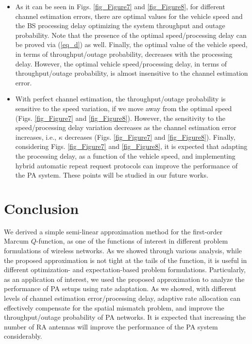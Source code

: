 \begin{itemize}
\begin{figure}
\end{figure}

    
    \item As it can be seen in Figs. \ref{fig_Figure7} and \ref{fig_Figure8}, for different channel estimation errors, there are optimal values for the vehicle speed and the BS processing delay optimizing the system throughput and outage probability. Note that the presence of the optimal speed/processing delay can be proved via (\ref{eq_d}) as well. Finally, the optimal value of the vehicle speed, in terms of throughput/outage probability, decreases with the processing delay. However, the optimal vehicle speed/processing delay, in terms of throughput/outage probability, is almost insensitive to the channel estimation error.
    




    \item With perfect channel estimation, the throughput/outage probability is sensitive to the speed variation, if we move away from the optimal speed (Figs. \ref{fig_Figure7} and \ref{fig_Figure8}). However, the sensitivity to the speed/processing delay variation decreases as the channel estimation error increases, i.e., $\kappa$ decreases (Figs. \ref{fig_Figure7} and \ref{fig_Figure8}). Finally, considering Figs. \ref{fig_Figure7} and \ref{fig_Figure8}, it is expected that adapting the processing delay, as a function of the vehicle speed, and implementing hybrid automatic repeat request protocols can improve the performance of the PA system. These points will be studied in our future works.

\end{itemize}









\section{Conclusion}
We derived a simple semi-linear approximation method for the first-order Marcum $Q$-function, as one of the functions of interest in different problem formulations of wireless networks. As we showed through various analysis, while the proposed approximation is not tight at the tails of the function, it is useful in different optimization- and expectation-based problem formulations. Particularly, as an application of interest, we used the proposed approximation to analyze the performance of PA setups using  rate adaptation. As we showed, with different levels of channel estimation error/processing delay, adaptive rate allocation can effectively compensate for the spatial mismatch problem, and improve the throughput/outage probability of PA networks.  It is expected that increasing the number of RA antennas will improve the performance of the PA system considerably. 





